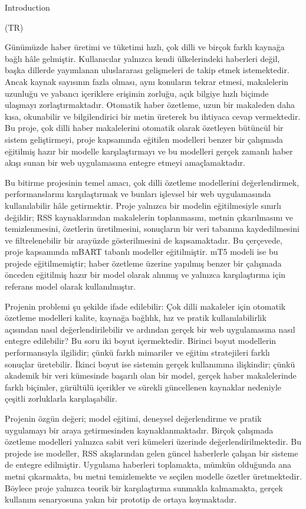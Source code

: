 Introduction

(TR)

Günümüzde haber üretimi ve tüketimi hızlı, çok dilli ve birçok farklı kaynağa bağlı hâle gelmiştir. Kullanıcılar yalnızca kendi ülkelerindeki haberleri değil, başka dillerde yayımlanan uluslararası gelişmeleri de takip etmek istemektedir. Ancak kaynak sayısının fazla olması, aynı konuların tekrar etmesi, makalelerin uzunluğu ve yabancı içeriklere erişimin zorluğu, açık bilgiye hızlı biçimde ulaşmayı zorlaştırmaktadır. Otomatik haber özetleme, uzun bir makaleden daha kısa, okunabilir ve bilgilendirici bir metin üreterek bu ihtiyaca cevap vermektedir. Bu proje, çok dilli haber makalelerini otomatik olarak özetleyen bütüncül bir sistem geliştirmeyi, proje kapsamında eğitilen modelleri benzer bir çalışmada eğitilmiş hazır bir modelle karşılaştırmayı ve bu modelleri gerçek zamanlı haber akışı sunan bir web uygulamasına entegre etmeyi amaçlamaktadır.

Bu bitirme projesinin temel amacı, çok dilli özetleme modellerini değerlendirmek, performanslarını karşılaştırmak ve bunları işlevsel bir web uygulamasında kullanılabilir hâle getirmektir. Proje yalnızca bir modelin eğitilmesiyle sınırlı değildir; RSS kaynaklarından makalelerin toplanmasını, metnin çıkarılmasını ve temizlenmesini, özetlerin üretilmesini, sonuçların bir veri tabanına kaydedilmesini ve filtrelenebilir bir arayüzde gösterilmesini de kapsamaktadır. Bu çerçevede, proje kapsamında mBART tabanlı modeller eğitilmiştir. mT5 modeli ise bu projede eğitilmemiştir; haber özetleme üzerine yapılmış benzer bir çalışmada önceden eğitilmiş hazır bir model olarak alınmış ve yalnızca karşılaştırma için referans model olarak kullanılmıştır.

Projenin problemi şu şekilde ifade edilebilir: Çok dilli makaleler için otomatik özetleme modelleri kalite, kaynağa bağlılık, hız ve pratik kullanılabilirlik açısından nasıl değerlendirilebilir ve ardından gerçek bir web uygulamasına nasıl entegre edilebilir? Bu soru iki boyut içermektedir. Birinci boyut modellerin performansıyla ilgilidir; çünkü farklı mimariler ve eğitim stratejileri farklı sonuçlar üretebilir. İkinci boyut ise sistemin gerçek kullanımına ilişkindir; çünkü akademik bir veri kümesinde başarılı olan bir model, gerçek haber makalelerinde farklı biçimler, gürültülü içerikler ve sürekli güncellenen kaynaklar nedeniyle çeşitli zorluklarla karşılaşabilir.

Projenin özgün değeri; model eğitimi, deneysel değerlendirme ve pratik uygulamayı bir araya getirmesinden kaynaklanmaktadır. Birçok çalışmada özetleme modelleri yalnızca sabit veri kümeleri üzerinde değerlendirilmektedir. Bu projede ise modeller, RSS akışlarından gelen güncel haberlerle çalışan bir sisteme de entegre edilmiştir. Uygulama haberleri toplamakta, mümkün olduğunda ana metni çıkarmakta, bu metni temizlemekte ve seçilen modelle özetler üretmektedir. Böylece proje yalnızca teorik bir karşılaştırma sunmakla kalmamakta, gerçek kullanım senaryosuna yakın bir prototip de ortaya koymaktadır.

